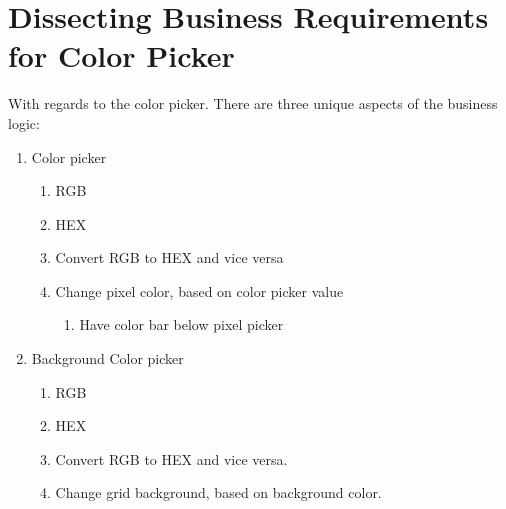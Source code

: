 \section{ Dissecting Business Requirements for Color Picker }
With regards to the color picker. There are three unique aspects of the business
logic:
\begin{enumerate}
  \item Color picker
    \begin{enumerate}
      \item RGB
      \item HEX
      \item Convert RGB to HEX and vice versa
      \item Change pixel color, based on color picker value
        \begin{enumerate}
          \item Have color bar below pixel picker
        \end{enumerate}
    \end{enumerate}
  \item Background Color picker
    \begin{enumerate}
      \item RGB
      \item HEX
      \item Convert RGB to HEX and vice versa.
      \item Change grid background, based on background color.
    \end{enumerate}
\end{enumerate}

